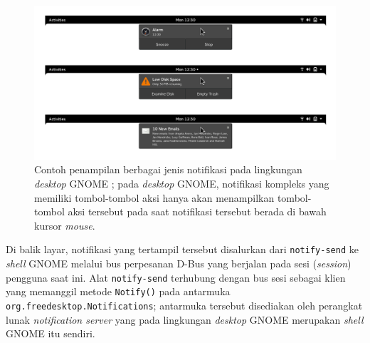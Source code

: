 \begin{figure}
    \centering
    \includegraphics[width=1\linewidth]{archives//contents-template-pak-prapto//chapter-4/banners-expanded.png}
    \caption{Contoh penampilan berbagai jenis notifikasi pada lingkungan \textit{desktop} GNOME \cite{gnome-hig-notifications}; pada \textit{desktop} GNOME, notifikasi kompleks yang memiliki tombol-tombol aksi hanya akan menampilkan tombol-tombol aksi tersebut pada saat notifikasi tersebut berada di bawah kursor \textit{mouse}.}
    \label{example-of-notification-with-action-buttons-on-gnome-desktop}
\end{figure}

Di balik layar, notifikasi yang tertampil tersebut disalurkan dari \verb|notify-send| ke \textit{shell} GNOME melalui bus perpesanan D-Bus yang berjalan pada sesi (\textit{session}) pengguna saat ini. Alat \verb|notify-send| terhubung dengan bus sesi sebagai klien yang memanggil metode \verb|Notify()| pada antarmuka \verb|org.freedesktop.Notifications|; antarmuka tersebut disediakan oleh perangkat lunak \textit{notification server} yang pada lingkungan \textit{desktop} GNOME merupakan \textit{shell} GNOME itu sendiri.

